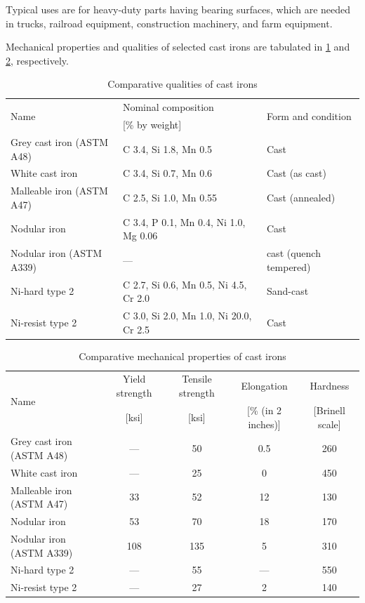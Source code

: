 \documentclass[
10pt,
a4paper,
openany,
svgnames,
]{book}
\begin{document}
Typical uses are for heavy-duty parts having bearing surfaces, which are needed in trucks, railroad equipment, construction machinery, and farm equipment.

Mechanical properties and qualities of selected cast irons are tabulated in \cref{tab: cast iron quals} and \cref{tab: cast iron props}, respectively.

\begin{table}[H]
  \centering
  \begin{tabular}{lll}
    \toprule
    \multirow{2}{2cm}{Name} & Nominal composition & \multirow{2}{3.5cm}{Form and condition} \\
                            & {[}\% by weight{]} & \\
    \midrule
    Grey cast iron (ASTM A48) & C 3.4, Si 1.8, Mn 0.5                  & Cast \\
    White cast iron           & C 3.4, Si 0.7, Mn 0.6                  & Cast (as cast) \\
    Malleable iron (ASTM A47) & C 2.5, Si 1.0, Mn 0.55                 & Cast (annealed) \\
    Nodular iron              & C 3.4, P 0.1, Mn 0.4, Ni 1.0, Mg 0.06  & Cast \\
    Nodular iron (ASTM A339)  & —                                      & cast (quench tempered) \\
    Ni-hard type 2            & C 2.7, Si 0.6, Mn 0.5, Ni 4.5, Cr 2.0  & Sand-cast \\
    Ni-resist type 2          & C 3.0, Si 2.0, Mn 1.0, Ni 20.0, Cr 2.5 & Cast \\
    \bottomrule
  \end{tabular}
  \caption{Comparative qualities of cast irons \cite*{plisga2017standard}}
  \label{tab: cast iron quals}
\end{table}

\begin{table}[H]
  \centering
  \begin{tabular}{lcccc}
    \toprule
    \multirow{2}{2cm}{Name} & Yield strength & Tensile strength & Elongation & Hardness \\
                            & {[}ksi{]} & {[}ksi{]} & {[}\% (in 2 inches){]} & {[}Brinell scale{]} \\
    \midrule
    Grey cast iron (ASTM A48) & — & 50 & 0.5 & 260 \\
    White cast iron & — & 25 & 0 & 450 \\
    Malleable iron (ASTM A47) & 33 & 52 & 12 & 130 \\
    Nodular iron & 53 & 70 & 18 & 170 \\
    Nodular iron (ASTM A339) & 108 & 135 & 5 & 310 \\
    Ni-hard type 2 & — & 55 & — & 550 \\
    Ni-resist type 2 & — & 27 & 2 & 140 \\
    \bottomrule
  \end{tabular}
  \caption{Comparative mechanical properties of cast irons \cite{plisga2017standard}}
  \label{tab: cast iron props}
\end{table}
\end{document}
